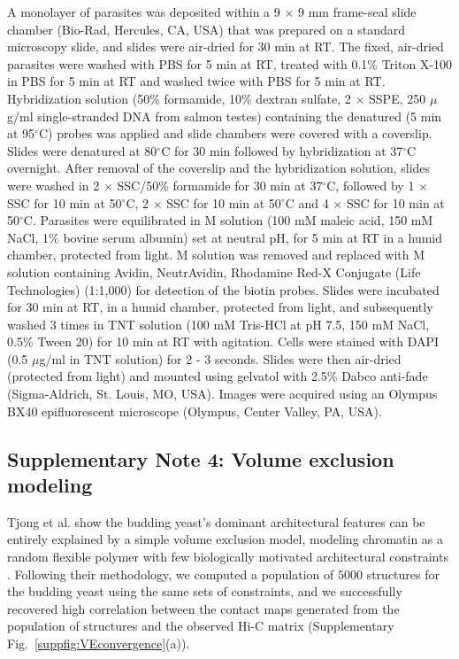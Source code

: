 \documentclass{article}
\begin{document}
A monolayer of parasites was deposited within a 9 $\times$ 9 mm frame-seal slide chamber (Bio-Rad, Hercules, CA, USA) that was prepared on a standard microscopy slide, and slides were air-dried for 30 min at RT. The fixed, air-dried parasites were washed with PBS for 5 min at RT, treated with 0.1\% Triton X-100 in PBS for 5 min at RT and washed twice with PBS for 5 min at RT. Hybridization solution (50\% formamide, 10\% dextran sulfate, 2 $\times$ SSPE, 250 $\mu$g/ml single-stranded DNA from salmon testes) containing the denatured (5 min at 95$^\circ$C) probes was applied and slide chambers were covered with a coverslip. Slides were denatured at 80$^\circ$C for 30 min followed by hybridization at 37$^\circ$C overnight. After removal of the coverslip and the hybridization solution, slides were washed in 2 $\times$ SSC/50\% formamide for 30 min at 37$^\circ$C, followed by 1 $\times$ SSC for 10 min at 50$^\circ$C, 2 $\times$ SSC for 10 min at 50$^\circ$C and 4 $\times$ SSC for 10 min at 50$^\circ$C. Parasites were equilibrated in M solution (100 mM maleic acid, 150 mM NaCl, 1\% bovine serum albumin) set at neutral pH, for 5 min at RT in a humid chamber, protected from light. M solution was removed and replaced with M solution containing Avidin, NeutrAvidin, Rhodamine Red-X Conjugate (Life Technologies) (1:1,000) for detection of the biotin probes. Slides were incubated for 30 min at RT, in a humid chamber, protected from light, and subsequently washed 3 times in TNT solution (100 mM Tris-HCl at pH 7.5, 150 mM NaCl, 0.5\% Tween 20) for 10 min at RT with agitation. Cells were stained with DAPI (0.5 $\mu$g/ml in TNT solution) for 2 - 3  seconds. Slides were then air-dried (protected from light) and mounted using gelvatol with 2.5\% Dabco anti-fade (Sigma-Aldrich, St. Louis, MO, USA). Images were acquired using an Olympus BX40 epifluorescent microscope (Olympus, Center Valley, PA, USA).


\subsection*{Supplementary Note 4: Volume exclusion modeling}
\label{supp:volume-exclusion}

Tjong et al. show the budding yeast's dominant architectural features
can be entirely explained by a simple volume exclusion model, modeling
chromatin as a random flexible polymer with few biologically motivated
architectural constraints \cite{tjong:physical}. Following their
methodology, we computed a population of $5000$ structures for the
budding yeast using the same sets of constraints, and we successfully
recovered high correlation between the contact maps
generated from the population of structures and the observed Hi-C
matrix (Supplementary Fig.~\ref{suppfig:VEconvergence}(a)).
\end{document}
